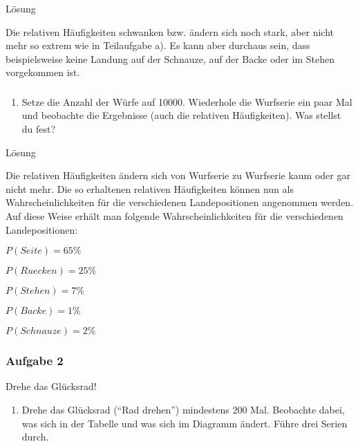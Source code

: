 \documentclass[
  ngerman,
]{book}
\providecommand{\tightlist}{%
  \setlength{\itemsep}{0pt}\setlength{\parskip}{0pt}}
\begin{document}
Lösung

Die relativen Häufigkeiten schwanken bzw. ändern sich noch stark, aber nicht mehr so extrem wie in Teilaufgabe a). Es kann aber durchaus sein, dass beispielsweise keine Landung auf der Schnauze, auf der Backe oder im Stehen vorgekommen ist.

\hypertarget{section-76}{%
\subsubsection*{}\label{section-76}}

\begin{enumerate}
\def\labelenumi{\alph{enumi})}
\setcounter{enumi}{2}
\tightlist
\item
  Setze die Anzahl der Würfe auf 10000. Wiederhole die Wurfserie ein paar Mal und beobachte die Ergebnisse (auch die relativen Häufigkeiten). Was stellst du fest?
\end{enumerate}

Lösung

Die relativen Häufigkeiten ändern sich von Wurfserie zu Wurfserie kaum oder gar nicht mehr. Die so erhaltenen relativen Häufigkeiten können nun als Wahrscheinlichkeiten für die verschiedenen Landepositionen angenommen werden. Auf diese Weise erhält man folgende Wahrscheinlichkeiten für die verschiedenen Landepositionen:

\(P(Seite)=65\%\)

\(P(Ruecken)=25\%\)

\(P(Stehen)=7\%\)

\(P(Backe)=1\%\)

\(P(Schnauze)=2\%\)

\hypertarget{section-77}{%
\subsubsection*{}\label{section-77}}

\hypertarget{aufgabe-2-9}{%
\subsubsection*{Aufgabe 2}\label{aufgabe-2-9}}

Drehe das Glücksrad!

\begin{enumerate}
\def\labelenumi{\alph{enumi})}
\tightlist
\item
  Drehe das Glücksrad (``Rad drehen'') mindestens 200 Mal. Beobachte dabei, was sich in der Tabelle und was sich im Diagramm ändert. Führe drei Serien durch.
\end{enumerate}
\end{document}
